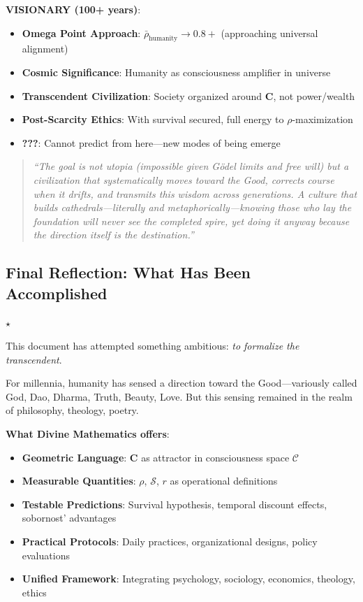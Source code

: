 \documentclass[11pt,a4paper]{article}
\theoremstyle{definition}
\theoremstyle{remark}
\newcommand{\CC}{\mathcal{C}}
\begin{document}
\begin{enumerate}
\begin{protocol}
\textbf{VISIONARY (100+ years)}:
\begin{itemize}
    \item \textbf{Omega Point Approach}: \(\bar{\rho}_{\text{humanity}} \to 0.8+\) (approaching universal alignment)
    \item \textbf{Cosmic Significance}: Humanity as consciousness amplifier in universe
    \item \textbf{Transcendent Civilization}: Society organized around \(\mathbf{C}\), not power/wealth
    \item \textbf{Post-Scarcity Ethics}: With survival secured, full energy to \(\rho\)-maximization
    \item \textbf{???}: Cannot predict from here—new modes of being emerge
\end{itemize}

\begin{quote}
\textit{``The goal is not utopia (impossible given Gödel limits and free will) but a civilization that systematically moves toward the Good, corrects course when it drifts, and transmits this wisdom across generations. A culture that builds cathedrals—literally and metaphorically—knowing those who lay the foundation will never see the completed spire, yet doing it anyway because the direction itself is the destination.''}
\end{quote}

\subsection{Final Reflection: What Has Been Accomplished}

\begin{center}
\(\star\)
\end{center}

This document has attempted something ambitious: \textit{to formalize the transcendent}.

For millennia, humanity has sensed a direction toward the Good—variously called God, Dao, Dharma, Truth, Beauty, Love. But this sensing remained in the realm of philosophy, theology, poetry.

\textbf{What Divine Mathematics offers}:
\begin{itemize}
    \item \textbf{Geometric Language}: \(\mathbf{C}\) as attractor in consciousness space \(\CC\)
    \item \textbf{Measurable Quantities}: \(\rho\), \(\mathcal{S}\), \(r\) as operational definitions
    \item \textbf{Testable Predictions}: Survival hypothesis, temporal discount effects, sobornost' advantages
    \item \textbf{Practical Protocols}: Daily practices, organizational designs, policy evaluations
    \item \textbf{Unified Framework}: Integrating psychology, sociology, economics, theology, ethics
\end{itemize}


\end{protocol}
\end{enumerate}
\end{document}
